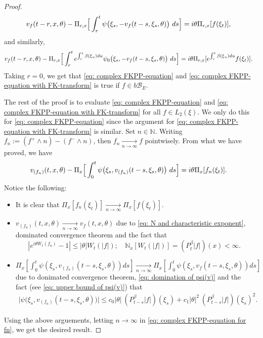 \documentclass[12pt, a4paper]{amsart}
\theoremstyle{definition}
\numberwithin{equation}{section}
\begin{document}
\begin{proof}
\begin{equation}
    v_f(t-r,x,\theta) - \Pi_{r,x} \Big[\int_r^t \psi\big(\xi_s,-v_f(t-s,\xi_s,\theta)\big) ~ds\Big]
	\\= i\theta \Pi_{r,x} [f(\xi_t)],
\end{equation}
    and similarly,
\begin{equation}
    v_f(t-r,x,\theta) - \Pi_{r,x} \Big[\int_r^t e^{\int_r^s \beta(\xi_u)du} \psi_0\big(\xi_s,-v_f(t-s,\xi_s,\theta)\big) ~ds\Big]
    \\= i\theta \Pi_{r,x} [e^{\int_r^t\beta(\xi_u)du}f(\xi_t)].
\end{equation}
    Taking $r = 0$, we get that \eqref{eq: complex FKPP-equation} and \eqref{eq: complex FKPP-equation with FK-transform} is true if $f\in b\mathscr B_E$.

    The rest of the proof is to evaluate \eqref{eq: complex FKPP-equation} and \eqref{eq: complex FKPP-equation with FK-transform} for all $f\in L_2(\xi)$. We only do this for \eqref{eq: complex FKPP-equation} since the argument for \eqref{eq: complex FKPP-equation with FK-transform} is similar.
    Set $n \in \mathbb N$.
    Writing $f_n := (f^+ \wedge n) - (f^- \wedge n)$, then $f_n \xrightarrow[n\to \infty]{} f$ pointwisely.
    From what we have proved, we have
\begin{equation}
\label{eq: complex FKPP-equation for fn}
    v_{(f_n)}(t,x,\theta) - \Pi_{x} \Big[\int_0^t \psi\big(\xi_s,v_{(f_n)}(t-s,\xi_s,\theta)\big) ~ds\Big]
    \\= i\theta \Pi_{x} [f_n(\xi_t)].
\end{equation}
    Notice the following:
\begin{itemize}
\item
    It is clear that $\Pi_{x}[f_n(\xi_t)] \xrightarrow[n\to \infty]{} \Pi_{x}[f(\xi_t)]$.
\item
    $v_{(f_n)}(t,x,\theta) \xrightarrow[n\to \infty]{} v_f(t,x,\theta)$ due to \eqref{eq: N and characteristic exponent}, dominated convergence theorem and the fact that
\[
    |e^{i\theta W_t(f_n)} - 1| \leq |\theta| W_t(|f|);
    \quad \mathbb N_x[W_t(|f|)] = (P_t^\beta |f|)(x) < \infty.
\]
\item
    $\Pi_{x} [\int_0^t \psi(\xi_s,v_{(f_n)}(t-s,\xi_s,\theta))ds] \xrightarrow[n\to \infty]{} \Pi_{x} [\int_0^t \psi(\xi_s,v_{f}(t-s,\xi_s,\theta))ds]$ due to donimated convergence theorem, \eqref{eq: domination of psi(v)} and the fact (see \eqref{eq: upper bound of psi(v)}) that
\begin{align}
    \big|\psi\big(\xi_s,v_{(f_n)}(t-s,\xi_s,\theta)\big)\big|
    \leq c_0|\theta|~(P^\beta_{t-s} |f|)(\xi_s)+c_1 |\theta|^2 ~(P^\beta_{t-s} |f|)(\xi_s)^2.
\end{align}
\end{itemize}
    Using the above arguements, letting $n \to \infty$ in \eqref{eq: complex FKPP-equation for fn}, we get the desired result.
\end{proof}
\end{document}
